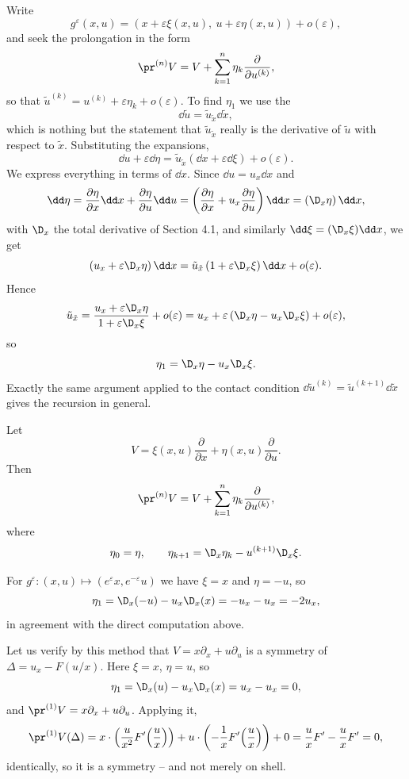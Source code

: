 Write
$$
g^\varepsilon(x,u) = \left(x + \varepsilon\xi(x,u),\ u + \varepsilon\eta(x,u)\right) + o(\varepsilon),
$$
and seek the prolongation in the form
$$
\pr^{(n)}V = V + \sum_{k=1}^n\eta_k\frac{\partial}{\partial u^{(k)}},
$$
so that $\tilde u^{(k)} = u^{(k)} + \varepsilon\eta_k + o(\varepsilon)$. To find $\eta_1$ we use the 
$$
\dd\tilde u = \tilde u_{\tilde x}\dd\tilde x,
$$
which is nothing but the statement that $\tilde u_{\tilde x}$ really is the derivative of $\tilde u$ with respect to $\tilde x$. Substituting the expansions,
$$
\dd u + \varepsilon\dd\eta = \tilde u_{\tilde x}\left(\dd x + \varepsilon\dd\xi\right) + o(\varepsilon).
$$
We express everything in terms of $\dd x$. Since $\dd u = u_x\dd x$ and
$$
\dd\eta = \frac{\partial\eta}{\partial x}\dd x + \frac{\partial\eta}{\partial u}\dd u = \left(\frac{\partial\eta}{\partial x} + u_x\frac{\partial\eta}{\partial u}\right)\dd x = \left(\D_x\eta\right)\dd x,
$$
with $\D_x$ the total derivative of Section 4.1, and similarly $\dd\xi = (\D_x\xi)\dd x$, we get
$$
\left(u_x + \varepsilon\D_x\eta\right)\dd x = \tilde u_{\tilde x}\left(1 + \varepsilon\D_x\xi\right)\dd x + o(\varepsilon).
$$
Hence
$$
\tilde u_{\tilde x} = \frac{u_x + \varepsilon\D_x\eta}{1+\varepsilon\D_x\xi} + o(\varepsilon) = u_x + \varepsilon\left(\D_x\eta - u_x\D_x\xi\right) + o(\varepsilon),
$$
so
$$
\eta_1 = \D_x\eta - u_x\D_x\xi.
$$
Exactly the same argument applied to the contact condition $\dd\tilde u^{(k)} = \tilde u^{(k+1)}\dd\tilde x$ gives the recursion in general.

\begin{proposition}
	Let
	$$
	V = \xi(x,u)\frac{\partial}{\partial x} + \eta(x,u)\frac{\partial}{\partial u}.
	$$
	Then
	$$
	\pr^{(n)}V = V + \sum_{k=1}^n\eta_k\frac{\partial}{\partial u^{(k)}},
	$$
	where
	$$
	\eta_0 = \eta, \qquad \eta_{k+1} = \D_x\eta_k - u^{(k+1)}\D_x\xi.
	$$
\end{proposition}

\begin{example}
	For $g^\varepsilon : (x,u)\mapsto(e^\varepsilon x, e^{-\varepsilon}u)$ we have $\xi = x$ and $\eta = -u$, so
	$$
	\eta_1 = \D_x(-u) - u_x\D_x(x) = -u_x - u_x = -2u_x,
	$$
	in agreement with the direct computation above.
\end{example}

\begin{example}
	Let us verify by this method that $V = x\partial_x + u\partial_u$ is a symmetry of $\Delta = u_x - F(u/x)$. Here $\xi = x$, $\eta = u$, so
	$$
	\eta_1 = \D_x(u) - u_x\D_x(x) = u_x - u_x = 0,
	$$
	and $\pr^{(1)}V = x\partial_x + u\partial_u$. Applying it,
	$$
	\pr^{(1)}V(\Delta) = x\cdot\left(\frac{u}{x^2}F'\!\left(\frac ux\right)\right) + u\cdot\left(-\frac1xF'\!\left(\frac ux\right)\right) + 0 = \frac uxF' - \frac uxF' = 0,
	$$
	identically, so it is a symmetry -- and not merely on shell.
\end{example}

